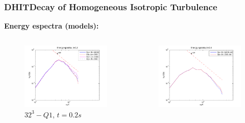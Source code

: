 \begin{frame}[t]
  \frametitle{DHIT{\small Decay of Homogeneous Isotropic Turbulence}}
  \textbf{Energy espectra (models):}
  \vspace*{-1.0cm}
  \begin{columns}
  \begin{column}{0.5\textwidth}
  \begin{figure}
    \centering	
    \includegraphics[width=1.1\textwidth]{Figures/spec_32_02_scaled}
    \vspace*{-0.8cm}
    \caption{$32^3-Q1$, $t=0.2s$}
  \end{figure}
  \end{column}
  \begin{column}{0.5\textwidth}
    \begin{figure}
    \centering	
    \includegraphics[width=1.1\textwidth]{Figures/spec_64_08}

\end{figure}
\end{column}
\end{columns}
\end{frame}
